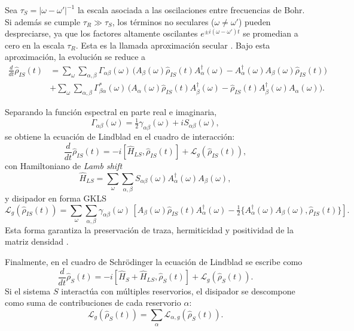 Sea $\tau_{S}=|\omega-\omega'|^{-1}$ la escala asociada a las oscilaciones entre frecuencias de Bohr. Si además se cumple $\tau_{R}\gg \tau_{S}$, los términos no seculares ($\omega\neq\omega'$) pueden despreciarse, ya que los factores altamente oscilantes $e^{\pm i(\omega-\omega')t}$ se promedian a cero en la escala $\tau_{R}$. Esta es la llamada aproximación secular \cite{breuer2002theory}. Bajo esta aproximación, la evolución se reduce a
\begin{align*}
    \frac{d}{dt}\hat{\rho}_{IS}(t) &=
    \sum_{\omega}\sum_{\alpha,\beta} \Gamma_{\alpha\beta}(\omega)\,
    \Big(A_{\beta}(\omega)\hat{\rho}_{IS}(t)A_{\alpha}^{\dagger}(\omega)
        - A_{\alpha}^{\dagger}(\omega)A_{\beta}(\omega)\hat{\rho}_{IS}(t)\Big) \\
    &+ \sum_{\omega}\sum_{\alpha,\beta} \Gamma^{*}_{\beta\alpha}(\omega)\,
    \Big(A_{\alpha}(\omega)\hat{\rho}_{IS}(t)A_{\beta}^{\dagger}(\omega)
        - \hat{\rho}_{IS}(t)A_{\beta}^{\dagger}(\omega)A_{\alpha}(\omega)\Big).
\end{align*}

Separando la función espectral en parte real e imaginaria,
\begin{equation*}
    \Gamma_{\alpha\beta}(\omega) = \tfrac{1}{2}\gamma_{\alpha\beta}(\omega) + iS_{\alpha\beta}(\omega),
\end{equation*}
se obtiene la ecuación de Lindblad en el cuadro de interacción:
\begin{equation}
    \frac{d}{dt}\hat{\rho}_{IS}(t) = -i[\hat{H}_{LS}, \hat{\rho}_{IS}(t)] + \mathcal{L}_{g}(\hat{\rho}_{IS}(t)),
    \label{seclindbladfinal}
\end{equation}
con Hamiltoniano de \emph{Lamb shift}
\begin{equation*}
    \hat{H}_{LS} = \sum_{\omega}\sum_{\alpha,\beta} S_{\alpha\beta}(\omega)A_{\alpha}^{\dagger}(\omega)A_{\beta}(\omega),
\end{equation*}
y disipador en forma GKLS
\begin{equation*}
    \mathcal{L}_{g}(\hat{\rho}_{IS}(t)) = \sum_{\omega}\sum_{\alpha,\beta} \gamma_{\alpha\beta}(\omega)\,
    \left[A_{\beta}(\omega)\hat{\rho}_{IS}(t)A_{\alpha}^{\dagger}(\omega) - \tfrac{1}{2}\{A_{\alpha}^{\dagger}(\omega)A_{\beta}(\omega), \hat{\rho}_{IS}(t)\}\right].
\end{equation*}
Esta forma garantiza la preservación de traza, hermiticidad y positividad de la matriz densidad \cite{manzano2020short}.

Finalmente, en el cuadro de Schrödinger la ecuación de Lindblad se escribe como
\begin{equation}
    \frac{d}{dt}\hat{\rho}_{S}(t) = -i[\hat{H}_{S}+\hat{H}_{LS}, \hat{\rho}_{S}(t)] + \mathcal{L}_{g}(\hat{\rho}_{S}(t)).
    \label{eqsec2:lindbladS}
\end{equation}
Si el sistema $S$ interactúa con múltiples reservorios, el disipador se descompone como suma de contribuciones de cada reservorio $\alpha$:
\begin{equation*}
    \mathcal{L}_{g}(\hat{\rho}_{S}(t)) = \sum_{\alpha}\mathcal{L}_{\alpha,g}(\hat{\rho}_{S}(t)).
\end{equation*}

